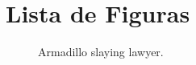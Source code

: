 \section{Lista de Figuras}
\begin{figure}[h]
\vspace{2.4in}
\caption{Armadillo slaying lawyer.}
\label{arm:fig1}
\end{figure}
\clearpage